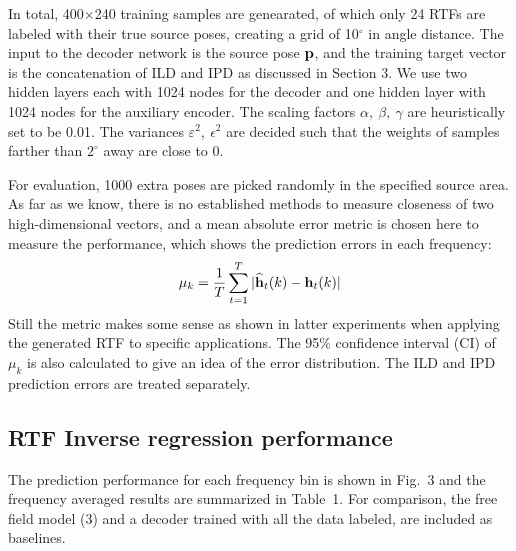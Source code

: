 \documentclass{article}
\begin{document}
In total, 400$\times$240 training samples are genearated, of which only 24 RTFs are labeled with their true source poses, creating a grid of 10$^\circ$ in angle distance. The input to the decoder network is the source pose ${\bf p}$, and the training target vector is the concatenation of ILD and IPD as discussed in Section 3. We use two hidden layers each with 1024 nodes for the decoder and one hidden layer with 1024 nodes for the auxiliary encoder. The scaling factors $\alpha,~\beta,~\gamma$ are heuristically set to be 0.01. The variances $\varepsilon^2,~\epsilon^2$ are decided such that the weights of samples farther than $2^\circ$ away are close to 0.

For evaluation, 1000 extra poses are picked randomly in the specified source area. As far as we know, there is no established methods to measure closeness of two high-dimensional vectors, and a mean absolute error metric is chosen here to measure the performance, which shows the prediction errors in each frequency:
\begin{equation}\label{eq:err}
  \mu_k = \frac{1}{T}\sum_{t=1}^{T}|\widehat{\bf h}_t(k)-{\bf h}_t(k)|
\end{equation}
Still the metric makes some sense as shown in latter experiments when applying the generated RTF to specific applications. The 95\% confidence interval (CI) of $\mu_k$ is also calculated to give an idea of the error distribution. The ILD and IPD prediction errors are treated separately.

\subsection{RTF Inverse regression performance }

The prediction performance for each frequency bin is shown in Fig.~3 and the frequency averaged results are summarized in Table~1. For comparison, the free field model (3) and a decoder trained with all the data labeled, are included as baselines.
\end{document}
